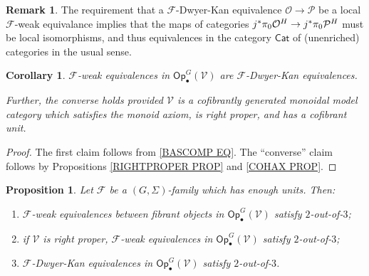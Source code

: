 \documentclass[a4paper,10pt
,draft
]{article}%
\numberwithin{equation}{section}
\numberwithin{figure}{section}
\newtheorem{proposition}[equation]{Proposition}%
\newtheorem{corollary}[equation]{Corollary}%
\theoremstyle{definition} %
\newtheorem{remark}[equation]{Remark}%
\newcommand{\F}{\ensuremath{\mathcal F}}
\newcommand{\V}{\ensuremath{\mathcal V}}
\renewcommand{\O}{\ensuremath{\mathcal O}}
\renewcommand{\P}{\ensuremath{\mathcal P}}
\newcommand{\1}{\ensuremath{\mathbbm 1}}%
\begin{document}
\begin{remark}\label{CATEQUIV REM}
The requirement that 
a $\F$-Dwyer-Kan equivalence $\O \to \P$
be a local $\F$-weak equivalance
implies that the maps of categories 
$j^{\**}\pi_0 \O^H \to j^{\**}\pi_0 \P^H$
must be local isomorphisms, 
and thus equivalences in the category $\mathsf{Cat}$
of (unenriched) categories in the usual sense.
\end{remark}



\begin{corollary}\label{WEDKEQ COR}
$\F$-weak equivalences in $\mathsf{Op}^G_\bullet(\V)$
are $\F$-Dwyer-Kan equivalences.
	
Further, the converse holds provided 
$\V$ is a cofibrantly generated monoidal model category
which satisfies the monoid axiom, is right proper,
and has a cofibrant unit.	
\end{corollary}

\begin{proof}
	The first claim follows from \eqref{BASCOMP EQ}.
	The ``converse'' claim follows by 
	Propositions \ref{RIGHTPROPER PROP} and \ref{COHAX PROP}.
\end{proof}







\begin{proposition}\label{2OUTOF3 PROP}
Let $\F$ be a $(G,\Sigma)$-family which has enough units. 
Then:
\begin{enumerate}[label=(\roman*)]
\item $\F$-weak equivalences between fibrant objects in $\mathsf{Op}^G_\bullet(\V)$
satisfy $2$-out-of-$3$;
\item if $\V$ is right proper, $\F$-weak equivalences in $\mathsf{Op}^G_\bullet(\V)$
satisfy $2$-out-of-$3$;
\item $\F$-Dwyer-Kan equivalences in $\mathsf{Op}^G_\bullet(\V)$
satisfy $2$-out-of-$3$.
\end{enumerate}
\end{proposition}
\end{document}
